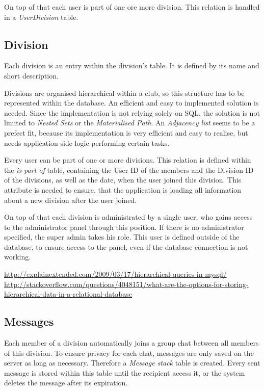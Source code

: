 On top of that each user is part of one ore more division. This relation is handled in a \emph{UserDivision} table.

\subsection{Division}
Each division is an entry within the division's table. It is defined by its name and short description.

Divisions are organised hierarchical within a club, so this structure has to be represented within the database. An efficient and easy to implemented solution is needed. Since the implementation is not relying solely on SQL, the solution is not limited to \emph{Nested Sets} or the \emph{Materialised Path}. An \emph{Adjacency list} seems to be a prefect fit, because its implementation is very efficient and easy to realise, but needs application side logic performing certain tasks. \cite{Hillyer:2014aa}

Every user can be part of one or more divisions. This relation is defined within the \emph{is part of} table, containing the User ID of the members and the Division ID of the divisions, as well as the date, when the user joined this division. This attribute is needed to ensure, that the application is loading all information about a new division after the user joined.

On top of that each division is administrated by a single user, who gains access to the administrator panel through this position. If there is no administrator specified, the super admin takes his role. This user is defined outside of the database, to ensure access to the panel, even if the database connection is not working.

\url{http://explainextended.com/2009/03/17/hierarchical-queries-in-mysql/}
\url{http://stackoverflow.com/questions/4048151/what-are-the-options-for-storing-hierarchical-data-in-a-relational-database}

\subsection{Messages}
Each member of a division automatically joins a group chat between all members of this division. To ensure privacy for each chat, messages are only saved on the server as long as necessary. Therefore a \emph{Message stack} table is created. Every sent message is stored within this table until the recipient access it, or the system deletes the message after its expiration. 

